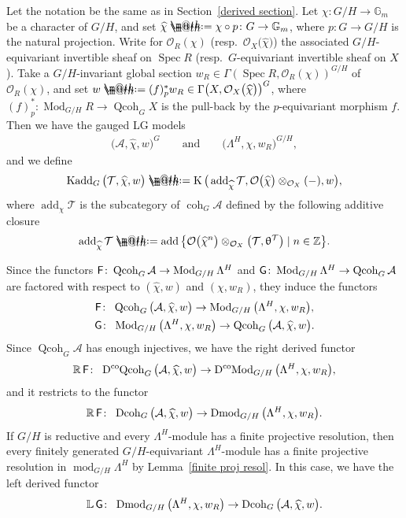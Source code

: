 \documentclass[pdftex]{sigma}%
\makeatletter
\newcommand*{\defeq}{\mathrel{\rlap{%
 \raisebox{0.3ex}{$\m@th\cdot$}}%
 \raisebox{-0.3ex}{$\m@th\cdot$}}%
 =}
\numberwithin{equation}{section}
\newcommand{\Kadd}{\operatorname{Kadd}}
\newcommand{\Dmod}{\operatorname{Dmod}}
\newcommand{\DcoMod}{\operatorname{D^{co}\hspace{-0.1mm}Mod}}
\newcommand{\Dcoh}{\operatorname{Dcoh}}
\newcommand{\DcoQcoh}{\operatorname{D^{co}\hspace{-0.1mm}Qcoh}}
\newcommand{\Spec}{\operatorname{Spec}}
\newcommand{\coh}{\operatorname{coh}}
\newcommand{\Qcoh}{\operatorname{Qcoh}}
\newcommand{\Mod}{\operatorname{Mod}}
\newcommand{\fmod}{\operatorname{mod}}
\newcommand{\add}{\operatorname{add}}
\newcommand{\K}{\operatorname{K}}
\newcommand{\cA}{\mathcal{A}}
\newcommand{\cO}{\mathcal{O}}
\newcommand{\cT}{\mathcal{T}}
\newcommand{\bG}{\mathbb{G}}
\newcommand{\bL}{\mathbb{L}}
\newcommand{\bR}{\mathbb{R}}
\newcommand{\bZ}{\mathbb{Z}}
\newcommand{\F}{\operatorname{\sf{F}}}
\newcommand{\G}{\operatorname{\sf{G}}}
\makeatother
\begin{document}
Let the notation be the same as in Section~\ref{derived section}.
Let $\chi\colon G/H\to \bG_m$ be a character of $G/H$, and set $\widehat{\chi}\defeq\chi\circ p\colon G\to \bG_m$, where $p\colon G\to G/H$ is the natural projection. Write for $\cO_R(\chi)$ (resp.\ $\cO_X\big(\widehat{\chi}\big)$) the associated $G/H$-equivariant invertible sheaf on $\Spec R$ (resp.\ $G$-equivariant invertible sheaf on $X$). Take a $G/H$-invariant global section $w_R\in \Gamma(\Spec R,\cO_R(\chi))^{G/H}$ of~$\cO_R(\chi)$, and set $w\defeq (f)^*_{p}w_R\in \Gamma\big(X,\cO_X\big(\widehat{\chi}\big)\big)^G$, where $(f)^*_{p}\colon \Mod_{G/H}R\to \Qcoh_GX$ is the pull-back by the $p$-equivariant morphism $f$.
Then we have the gauged LG models
\begin{gather*}
\big(\cA,\widehat{\chi},w\big)^G \qquad \text{and}\qquad \big(\Lambda^H,\chi,w_R\big)^{G/H},
\end{gather*}
and we define
\begin{gather*}
\Kadd_G\big(\cT,\widehat{\chi},w\big)\defeq \K\big(\add_{\widehat{\chi}}\cT,\cO\big(\widehat{\chi}\big)\otimes_{\cO_X}(-),w\big),
\end{gather*}
where $\add_{\widehat{\chi}}\cT$ is the subcategory of $\coh_G\cA$ defined by the following additive closure
\begin{gather*}
\add_{\widehat{\chi}}\cT\defeq\add\big\{\cO\big(\widehat{\chi}^n\big)\otimes_{\cO_X} \big(\cT,\uptheta^{\cT}\big)\mid n\in \bZ \big\}.
\end{gather*}


Since the functors $\F\colon \Qcoh_{G}\cA\to \Mod_{G/H}\Lambda^H$ and $\G\colon \Mod_{G/H}\Lambda^H\to \Qcoh_{G}\cA$ are factored with respect to $(\widehat{\chi},w)$ and $(\chi,w_R)$, they induce the functors
\begin{gather*}
\F\colon\ \Qcoh_G\big(\cA,\widehat{\chi},w\big)\to\Mod_{G/H}\big(\Lambda^H,\chi,w_R\big),
\\
\G\colon\ \Mod_{G/H}\big(\Lambda^H,\chi,w_R\big)\to \Qcoh_G\big(\cA,\widehat{\chi},w\big).
\end{gather*}
Since $\Qcoh_G\cA$ has enough injectives, we have the right derived functor
\begin{gather*}
\bR\F\colon\ \DcoQcoh_G\big(\cA,\widehat{\chi},w\big)\to\DcoMod_{G/H}\big(\Lambda^H,\chi,w_R\big),
\end{gather*}
and it restricts to the functor
\begin{gather*}
\bR\F\colon\ \Dcoh_G\big(\cA,\widehat{\chi},w\big)\to\Dmod_{G/H}\big(\Lambda^H,\chi,w_R\big).
\end{gather*}
If $G/H$ is reductive and every $\Lambda^H$-module has a finite projective resolution, then every finitely generated $G/H$-equivariant $\Lambda^H$-module has a finite projective resolution in $\fmod_{G/H}\Lambda^H$ by Lemma~\ref{finite proj resol}. In this case, we have the left derived functor
\begin{gather*}
\bL\G\colon\ \Dmod_{G/H}\big(\Lambda^H,\chi,w_R\big)\to \Dcoh_{G}\big(\cA,\widehat{\chi},w\big).
\end{gather*}
\end{document}

